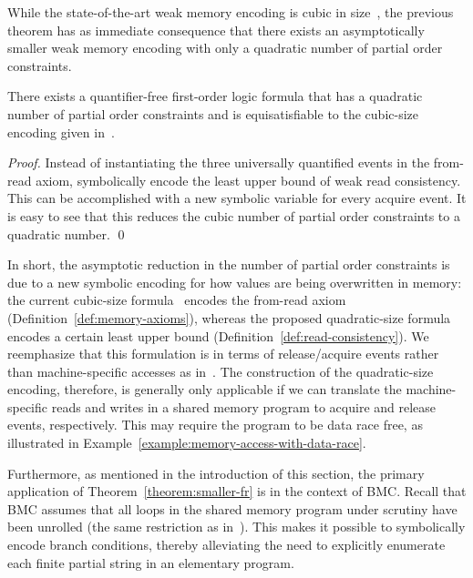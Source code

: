 \documentclass{llncs}
\begin{document}
While the state-of-the-art weak memory encoding is cubic in size~\cite{AKT2013}, the previous theorem has as immediate consequence that there exists an asymptotically smaller weak memory encoding with only a quadratic number of partial order constraints.

\begin{theorem}
\label{theorem:smaller-fr}
There exists a quantifier-free first-order logic formula that has a quadratic number of partial order constraints and is equisatisfiable to the cubic-size encoding given in~\cite{AKT2013}.
\end{theorem}

\begin{proof}
Instead of instantiating the three universally quantified events in the from-read axiom, symbolically encode the least upper bound of weak read consistency. This can be accomplished with a new symbolic variable for every acquire event. It is easy to see that this reduces the cubic number of partial order constraints to a quadratic number. \qed
\end{proof}

In short, the asymptotic reduction in the number of partial order constraints is due to a new symbolic encoding for how values are being overwritten in memory: the current cubic-size formula~\cite{AKT2013} encodes the from-read axiom (Definition~\ref{def:memory-axioms}), whereas the proposed quadratic-size formula encodes a certain least upper bound (Definition~\ref{def:read-consistency}). We reemphasize that this formulation is in terms of release/acquire events rather than machine-specific accesses as in~\cite{AKT2013}. The construction of the quadratic-size encoding, therefore, is generally only applicable if we can translate the machine-specific reads and writes in a shared memory program to acquire and release events, respectively. This may require the program to be data race free, as illustrated in Example~\ref{example:memory-access-with-data-race}.

Furthermore, as mentioned in the introduction of this section, the primary application of Theorem~\ref{theorem:smaller-fr} is in the context of BMC. Recall that BMC assumes that all loops in the shared memory program under scrutiny have been unrolled (the same restriction as in~\cite{AKT2013}). This makes it possible to symbolically encode branch conditions, thereby alleviating the need to explicitly enumerate each finite partial string in an elementary program.
\end{document}
